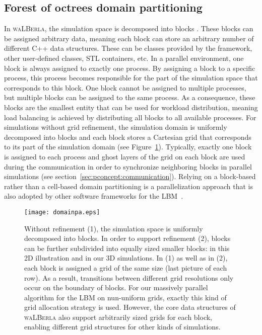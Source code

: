 \documentclass[final,leqno,onefignum,onetabnum]{siamltex1213}
\newcommand{\Walberla}{\textsc{waLBerla}}
\begin{document}
\subsection{Forest of octrees domain partitioning}\label{sec:pconcept:octree}

In \Walberla{}, the simulation space is decomposed into blocks \cite{Feichtinger2011105}.
These blocks can be assigned arbitrary data, meaning each block can store an arbitrary number of different C++ data structures.
These can be classes provided by the framework, other user-defined classes, STL containers, etc.
In a parallel environment, one block is always assigned to exactly one process.
By assigning a block to a specific process, this process becomes responsible for the part of the simulation space that corresponds to this block.
One block cannot be assigned to multiple processes, but multiple blocks can be assigned to the same process. As a consequence,
these blocks are the smallest entity that can be used for workload distribution, meaning load balancing is achieved by distributing all blocks to all available processes.
For simulations without grid refinement,
the simulation domain is uniformly decomposed into blocks and each block stores a Cartesian grid that corresponds to its part of the simulation domain (see Figure~\ref{fig:domain_decomposition}).
Typically, exactly one block is assigned to each process and ghost layers of the grid on each block are used during the communication in order to synchronize neighboring blocks in parallel simulations (see section~\ref{sec:pconcept:communication}).
Relying on a block-based rather than a cell-based domain partitioning is a parallelization approach that is also adopted by other software frameworks for the LBM~\cite{krause2010,fietz2012}.

\begin{figure}[tbp]
  \centering
  \texttt{[image: domainpa.eps]}
  \caption{Without refinement (1), the simulation space is uniformly decomposed into blocks.
In order to support refinement (2), blocks can be further subdivided into equally sized smaller blocks:
 in this 2D illustration and  in our 3D simulations.
In (1) as well as in (2), each block is assigned a grid of the same size (last picture of each row).
As a result, transitions between different grid resolutions only occur on the boundary of blocks.
For our massively parallel algorithm for the LBM on nun-uniform grids, exactly this kind of grid allocation strategy is used.
However, the core data structures of \Walberla{} also support arbitrarily sized grids for each block, enabling different grid structures for other kinds of simulations.}
  \label{fig:domain_decomposition}
\end{figure}
\end{document}
